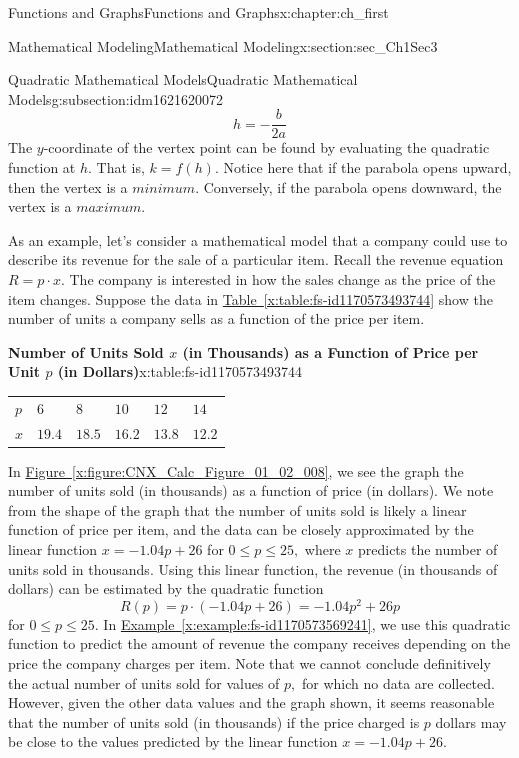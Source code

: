 \documentclass[oneside,10pt,]{book}
\newcommand{\tabularfont}{\relax}
\newcommand{\xreffont}{\relax}
\numberwithin{equation}{section}
\begin{document}
\begin{chapterptx}{Functions and Graphs}{}{Functions and Graphs}{}{}{x:chapter:ch_first}
\begin{sectionptx}{Mathematical Modeling}{}{Mathematical Modeling}{}{}{x:section:sec_Ch1Sec3}
\begin{subsectionptx}{Quadratic Mathematical Models}{}{Quadratic Mathematical Models}{}{}{g:subsection:idm1621620072}
\begin{equation*}
h=-\frac{b}{2a}
\end{equation*}
The \(y\)-coordinate of the vertex point can be found by evaluating the quadratic function at \(h\). That is, \(k=f(h)\). Notice here that if the parabola opens upward, then the vertex is a \(minimum\). Conversely, if the parabola opens downward, the vertex is a \(maximum\).%
\par
As an example, let’s consider a mathematical model that a company could use to describe its revenue for the sale of a particular item. Recall the revenue equation \(R=p·x.\) The company is interested in how the sales change as the price of the item changes. Suppose the data in \hyperref[x:table:fs-id1170573493744]{Table~{\xreffont\ref{x:table:fs-id1170573493744}}} show the number of units a company sells as a function of the price per item.%
\begin{tableptx}{\textbf{Number of Units Sold \(x\) (in Thousands) as a Function of Price per Unit \(p\) (in Dollars)}}{x:table:fs-id1170573493744}{}%
\centering%
{\tabularfont%
\begin{tabular}{llllll}
\(p\)&\(6 \)&\(8 \)&\(10 \)&\(12 \)&\(14 \)\tabularnewline[0pt]
\(x\)&\multicolumn{1}{c}{\(19.4 \)}&\multicolumn{1}{c}{\(18.5 \)}&\multicolumn{1}{c}{\(16.2 \)}&\multicolumn{1}{c}{\(13.8 \)}&\multicolumn{1}{c}{\(12.2 \)}
\end{tabular}
}%
\end{tableptx}%
In \hyperref[x:figure:CNX_Calc_Figure_01_02_008]{Figure~{\xreffont\ref{x:figure:CNX_Calc_Figure_01_02_008}}}, we see the graph the number of units sold (in thousands) as a function of price (in dollars). We note from the shape of the graph that the number of units sold is likely a linear function of price per item, and the data can be closely approximated by the linear function \(x= -1.04 p+ 26 \) for \(0 \leq  p\leq   25 ,\) where \(x\) predicts the number of units sold in thousands. Using this linear function, the revenue (in thousands of dollars) can be estimated by the quadratic function%
%
\begin{equation*}
R(p)=p\cdot( -1.04 p+ 26 )= -1.04p^2+ 26 p
\end{equation*}
for \(0 \leq  p\leq   25 .\) In \hyperref[x:example:fs-id1170573569241]{Example~{\xreffont\ref{x:example:fs-id1170573569241}}}, we use this quadratic function to predict the amount of revenue the company receives depending on the price the company charges per item. Note that we cannot conclude definitively the actual number of units sold for values of \(p,\) for which no data are collected. However, given the other data values and the graph shown, it seems reasonable that the number of units sold (in thousands) if the price charged is \(p\) dollars may be close to the values predicted by the linear function \(x= -1.04 p+ 26 .\)%

\end{subsectionptx}
\end{sectionptx}
\end{chapterptx}
\end{document}
